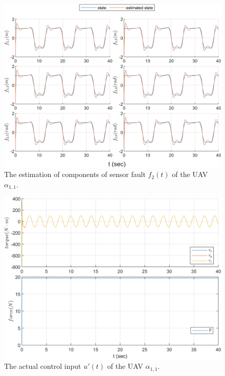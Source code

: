 \documentclass[journal,12pt,onecolumn,draftclsnofoot,]{IEEEtran}
\begin{document}
\begin{figure}[htbp]
    \centering
    \includegraphics[scale=.57]{fig/uav (3).png}\caption{The estimation of components of sensor fault $f_2(t)$ of the UAV $\alpha_{1,1}$.}%
    \label{fig:UAV, fs}
\end{figure}
\begin{figure}[htbp]
    \centering
    \includegraphics[scale=.57]{fig/uav (4).png}\caption{The actual control input $u'(t)$ of the UAV $\alpha_{1,1}$.}%
    \label{fig:UAV, control}
\end{figure}
\end{document}
